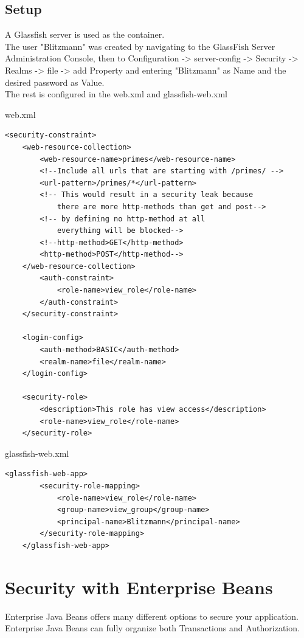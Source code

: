 \documentclass[12pt,a4paper]{report}
\begin{document}
\section{Setup}
A Glassfish server is used as the container.\\
The user "Blitzmann" was created by navigating to the GlassFish Server Administration Console, then to Configuration -> server-config -> Security -> Realms -> file -> add Property and entering "Blitzmann" as Name and the desired password as Value.\\
The rest is configured in the web.xml and glassfish-web.xml
\begin{bclogo}[couleur=yellow!15,arrondi=0.1,logo=\bccrayon, ombre = true]{web.xml}
	\begin{lstlisting}[style=XML]
    <security-constraint>
    <web-resource-collection>
	    <web-resource-name>primes</web-resource-name>
	    <!--Include all urls that are starting with /primes/ -->
	    <url-pattern>/primes/*</url-pattern>
	    <!-- This would result in a security leak because 
		    there are more http-methods than get and post-->
	    <!-- by defining no http-method at all 
		    everything will be blocked-->
	    <!--http-method>GET</http-method>
	    <http-method>POST</http-method-->
    </web-resource-collection>
	    <auth-constraint>
		    <role-name>view_role</role-name>
	    </auth-constraint>
    </security-constraint>
    
    <login-config>
	    <auth-method>BASIC</auth-method>
	    <realm-name>file</realm-name>
    </login-config>
    
    <security-role>
        <description>This role has view access</description>
        <role-name>view_role</role-name>
    </security-role>
	\end{lstlisting}
\end{bclogo}
\begin{bclogo}[couleur=yellow!15,arrondi=0.1,logo=\bccrayon, ombre = true]{glassfish-web.xml}
	\begin{lstlisting}[style=XML]
	<glassfish-web-app>
		<security-role-mapping>
			<role-name>view_role</role-name>
			<group-name>view_group</group-name>
			<principal-name>Blitzmann</principal-name>
		</security-role-mapping>
	</glassfish-web-app>
	\end{lstlisting}
\end{bclogo}

\chapter{Security with Enterprise Beans}
Enterprise Java Beans offers many different options to secure your application. Enterprise Java Beans can fully organize both Transactions and Authorization.
\end{document}
